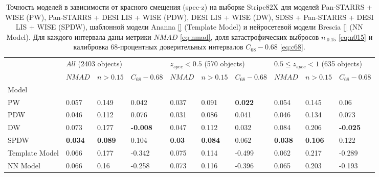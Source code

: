 \documentclass[fleqn,usenatbib]{mnras}
\begin{document}
\begin{table}
	\begin{tabular}{llllllllll}
            \hline
            {} & \multicolumn{3}{l}{$All$ (2403 objects)} & \multicolumn{3}{l}{$z_{spec} < 0.5$ (570 objects)} & \multicolumn{3}{l}{$0.5 \leq z_{spec} < 1$ (635 objects)} \\
            {} &               $NMAD$ &        $n>0.15$ &  $C_{68} - 0.68$ &                         $NMAD$ &        $n>0.15$ & $C_{68} - 0.68$ &                                $NMAD$ &        $n>0.15$ &  $C_{68} - 0.68$ \\
            Model          &                      &                 &                  &                                &                 &                 &                                       &                 &                  \\
            \hline
            PW             &                0.057 &           0.149 &            0.042 &                          0.037 &           0.091 &  \textbf{0.022} &                                 0.054 &           0.145 &             0.06 \\
            PDW            &                0.046 &           0.112 &            0.076 &                          0.031 &           0.086 &           0.041 &                                 0.046 &           0.134 &            0.073 \\
            DW             &                0.073 &           0.177 &  \textbf{-0.008} &                          0.047 &           0.112 &           0.032 &                                 0.084 &           0.206 &  \textbf{-0.025} \\
            SPDW           &       \textbf{0.034} &  \textbf{0.089} &            0.104 &                  \textbf{0.03} &  \textbf{0.084} &           0.062 &                        \textbf{0.038} &  \textbf{0.106} &            0.122 \\
            Template Model &                0.066 &           0.177 &           -0.342 &                          0.075 &           0.114 &          -0.499 &                                 0.062 &           0.217 &           -0.289 \\
            NN Model       &                0.066 &            0.16 &           -0.258 &                          0.073 &           0.116 &          -0.396 &                                 0.065 &           0.203 &           -0.193 \\
            \hline
            \end{tabular}
            \caption{Точность моделей в зависимости от красного смещения (spec-z) на выборке Stripe82X для моделей Pan-STARRS + WISE (PW), Pan-STARRS + DESI LIS + WISE (PDW), DESI LIS + WISE (DW), SDSS + Pan-STARRS + DESI LIS + WISE (SPDW), шаблонной модели Ananna \ref{} (Template Model) и нейросетевой модели Brescia \ref{} (NN Model). Для каждого интервала даны метрики $NMAD$ \eqref{eq:nmad}, доля катастрофических выбросов $n_{.0.15}$ \eqref{eq:n015} и калибровка 68-процентных доверительных интервалов $C_{68} - 0.68$ \eqref{eq:c68}.}
\end{table}
\end{document}
